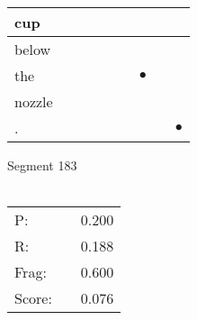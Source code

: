 \documentclass[landscape]{article}
\newcommand{\ssp}{\hspace{2pt}}
\newcommand{\mex}{\cellcolor{g}$\bullet$}
\begin{document}
\begin{tabular}{|l|p{10pt}|p{10pt}|p{10pt}|p{10pt}|p{10pt}|p{10pt}|p{10pt}|p{10pt}|}
\hline
\ssp cup \ssp&\hspace{2pt}&\hspace{2pt}&\hspace{2pt}&\hspace{2pt}&\hspace{2pt}&\hspace{2pt}&\hspace{2pt}&\hspace{2pt}\\
\hline
\ssp below \ssp&\hspace{2pt}&\hspace{2pt}&\hspace{2pt}&\hspace{2pt}&\hspace{2pt}&\hspace{2pt}&\hspace{2pt}&\hspace{2pt}\\
\hline
\ssp \cellcolor{ref5}the \ssp&\hspace{2pt}&\hspace{2pt}&\hspace{2pt}&\hspace{2pt}&\hspace{2pt}&\hspace{2pt}\mex&\hspace{2pt}&\hspace{2pt}\\
\hline
\ssp nozzle \ssp&\hspace{2pt}&\hspace{2pt}&\hspace{2pt}&\hspace{2pt}&\hspace{2pt}&\hspace{2pt}&\hspace{2pt}&\hspace{2pt}\\
\hline
\ssp \cellcolor{ref7}. \ssp&\hspace{2pt}&\hspace{2pt}&\hspace{2pt}&\hspace{2pt}&\hspace{2pt}&\hspace{2pt}&\hspace{2pt}&\hspace{2pt}\mex\\
\hline
\end{tabular}

\vspace{6pt}
\noindent Segment 183\\\\
\noindent\begin{tabular}{lm{12pt}r}
\hline
P:&&0.200\\
R:&&0.188\\
Frag:&&0.600\\
Score:&&0.076\\
\end{tabular}
\end{document}
